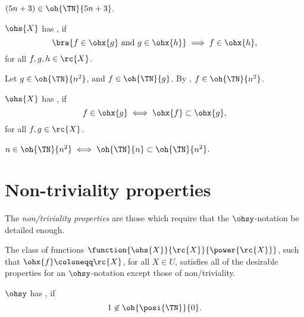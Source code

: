\documentclass[b5paper, english, oneside]{memoir}
\begin{document}
\begin{example}
$(5n + 3) \in \oh{\TN}{5n + 3}$.
\end{example}

\begin{definition}
$\ohs{X}$ has , if
\begin{equation}
\bra{f \in \ohx{g} \textrm{ and } g \in \ohx{h}} \implies f \in \ohx{h},
\end{equation}
for all $f, g, h \in \rc{X}$.
\end{definition}

\begin{example}
Let $g \in \oh{\TN}{n^2}$, and $f \in \oh{\TN}{g}$. By , $f \in \oh{\TN}{n^2}$.
\end{example}

\begin{definition}
$\ohs{X}$ has , if
\begin{equation}
f \in \ohx{g} \iff \ohx{f} \subset \ohx{g},
\end{equation}
for all $f, g \in \rc{X}$. 
\end{definition}

\begin{example}
$n \in \oh{\TN}{n^2} \iff \oh{\TN}{n} \subset \oh{\TN}{n^2}$.
\end{example}

\section{Non-triviality properties}

The \emph{non\-/triviality properties} are those which require that the $\ohsy$-notation be detailed enough. 

\begin{example}
The class of functions $\function{\ohs{X}}{\rc{X}}{\power{\rc{X}}}$, such that $\ohx{f} \coloneqq \rc{X}$, for all $X \in U$, satisfies all of the desirable properties for an $\ohsy$-notation except those of non\-/triviality.
\end{example}

\begin{definition}
$\ohsy$ has , if
\begin{equation}
1 \not\in \oh{\posi{\TN}}{0}.
\end{equation}
\end{definition}
\end{document}

